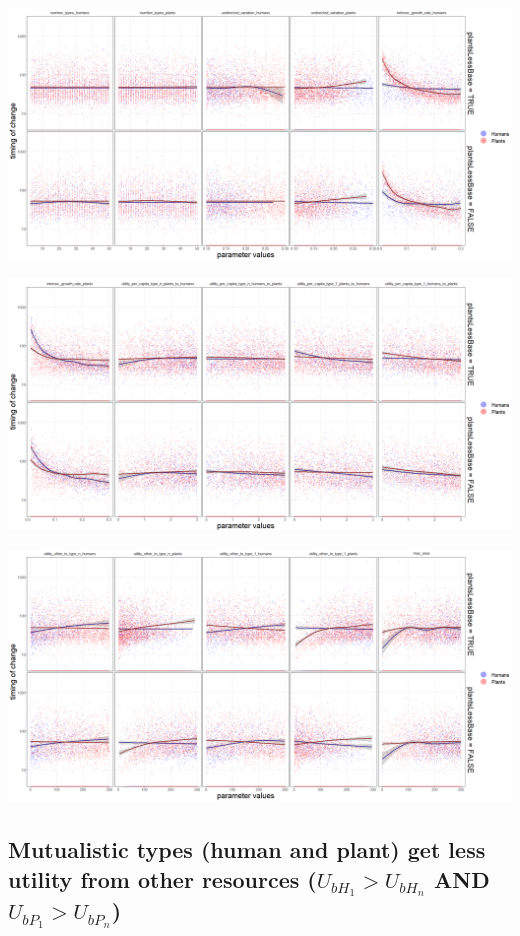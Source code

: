 \documentclass[
]{book}
\begin{document}
\includegraphics[width=1\linewidth]{plots/5_LHS_plantsLessBase_timing_bifurcationPlot_twoVariables_per_parameter_and_scenario_part1}

\includegraphics[width=1\linewidth]{plots/5_LHS_plantsLessBase_timing_bifurcationPlot_twoVariables_per_parameter_and_scenario_part2}

\includegraphics[width=1\linewidth]{plots/5_LHS_plantsLessBase_timing_bifurcationPlot_twoVariables_per_parameter_and_scenario_part3}

\newpage

\hypertarget{mutualistic-types-human-and-plant-get-less-utility-from-other-resources-u_bh_1u_bh_n-and-u_bp_1u_bp_n}{%
\subsection{\texorpdfstring{Mutualistic types (human and plant) get less utility from other resources (\(U_{bH_{1}}>U_{bH_{n}}\) AND \(U_{bP_{1}}>U_{bP_{n}}\))}{Mutualistic types (human and plant) get less utility from other resources (U\_\{bH\_\{1\}\}\textgreater U\_\{bH\_\{n\}\} AND U\_\{bP\_\{1\}\}\textgreater U\_\{bP\_\{n\}\})}}\label{mutualistic-types-human-and-plant-get-less-utility-from-other-resources-u_bh_1u_bh_n-and-u_bp_1u_bp_n}}
\end{document}

